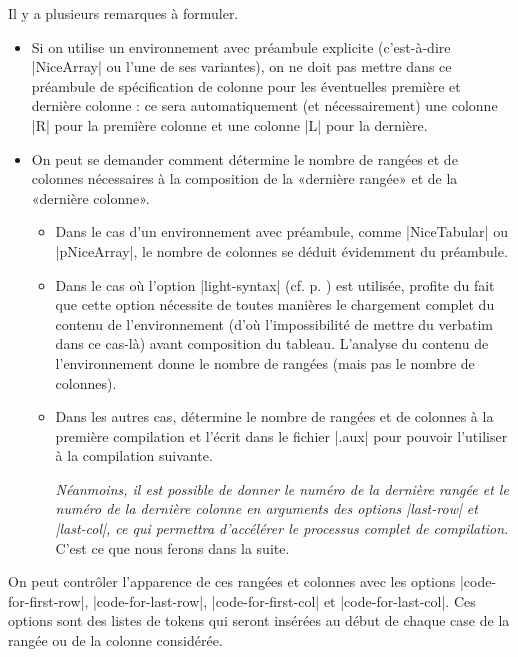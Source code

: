 \documentclass[dvipsnames]{article}%
\begin{document}
\bigskip
Il y a plusieurs remarques à formuler.
%
\begin{itemize}[beginpenalty=10000]
\item Si on utilise un environnement avec préambule explicite (c'est-à-dire
|{NiceArray}| ou l'une de ses variantes), on ne doit pas mettre dans ce
préambule de spécification de colonne pour les éventuelles première et dernière
colonne : ce sera automatiquement (et nécessairement) une colonne |R| pour la
première colonne et une colonne |L| pour la dernière.

\item On peut se demander comment  détermine le nombre de rangées et de colonnes nécessaires à la
composition de la «dernière rangée» et de la «dernière colonne».

\begin{itemize}
\item Dans le cas d'un environnement avec préambule, comme |{NiceTabular}| ou
|{pNiceArray}|, le nombre de colonnes se déduit évidemment du préambule.

\item Dans le cas où l'option |light-syntax| (cf. p. \pageref{light-syntax}) est
utilisée,  profite du fait que cette option nécessite de toutes
manières le chargement complet du contenu de l'environnement (d'où
l'impossibilité de mettre du verbatim dans ce cas-là) avant composition du
tableau. L'analyse du contenu de l'environnement donne le nombre de rangées
(mais pas le nombre de colonnes).

\item Dans les autres cas,  détermine le nombre de rangées et de
colonnes à la première compilation et l'écrit dans le fichier |.aux| pour
pouvoir l'utiliser à la compilation suivante.

\textsl{Néanmoins, il est possible de donner le numéro de la dernière rangée et
  le numéro de la dernière colonne en arguments des options |last-row| et
  |last-col|, ce qui permettra d'accélérer le processus complet de compilation.}
C'est ce que nous ferons dans la suite.
\end{itemize}

\end{itemize}



\bigskip
On peut contrôler l'apparence de ces rangées et colonnes avec les options
|code-for-first-row|, |code-for-last-row|, |code-for-first-col| et
|code-for-last-col|. Ces options sont des listes de tokens qui seront insérées
au début de chaque case de la rangée ou de la colonne considérée.
\end{document}
